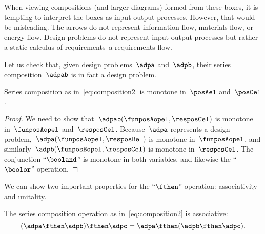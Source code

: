\begin{remark}
    When viewing compositions (and larger diagrams) formed from these boxes, it is tempting to interpret the boxes as input-output processes.
    However, that would be misleading.
    The arrows do not represent information flow, materials flow, or energy flow.
    Design problems do not represent input-output processes but rather a static calculus of requirements--a requirements flow.
\end{remark}

Let us check that, given design problems~$\adpa$ and~$\adpb$, their series composition~$\adpab$ is in fact a design problem.
\begin{lemma}
    Series composition as in~\cref{eq:composition2} is monotone in~$\posAel$ and~$\posCel$.
\end{lemma}
\begin{proof}
    We need to show that~$\adpab(\funposAopel,\resposCel)$ is monotone in~$\funposAopel$ and~$\resposCel$.
    Because~$\adpa$ represents a design problem,~$\adpa(\funposAopel,\resposBel)$ is monotone in~$\funposAopel$, and similarly~$\adpb(\funposBopel,\resposCel)$ is monotone in~$\resposCel$.
    The conjunction ``$\booland$'' is monotone in both variables, and likewise the ``$\boolor$'' operation.
\end{proof}

We can show two important properties for the ``$\fthen$'' operation: associativity and unitality.
\begin{lemma}
    The series composition operation as in~\cref{eq:composition2} is associative:
    \begin{equation}
        (\adpa\fthen \adpb)
        \fthen \adpc = \adpa\fthen (\adpb\fthen \adpc).
    \end{equation}
\end{lemma}

